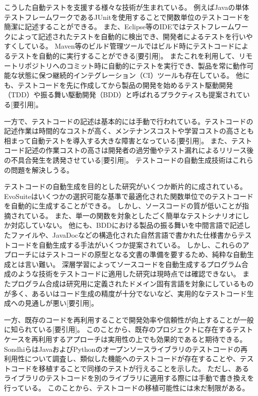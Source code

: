 \documentclass[conference]{IEEEtran}
\begin{document}
こうした自動テストを支援する様々な技術が生まれている。
例えばJavaの単体テストフレームワークであるJUnitを使用することで関数単位のテストコードを簡潔に記述することができる\cite{JUnit}。
また、Eclipse等のIDEではテストフレームワークによって記述されたテストを自動的に検出でき、開発者によるテストを行いやすくしている\cite{Eclipse}。
Maven等のビルド管理ツールではビルド時にテストコードによるテストを自動的に実行することができる[要引用]。
またこれを利用して、リモートリポジトリへのコミット時に自動的にテストを実行でき、製品を常に動作可能な状態に保つ継続的インテグレーション（CI）ツールも存在している\cite{TravisCI}。
他にも、テストコードを先に作成してから製品の開発を始めるテスト駆動開発（TDD）や振る舞い駆動開発（BDD）と呼ばれるプラクティスも提案されている[要引用]。

一方で、テストコードの記述は基本的には手動で行われている。テストコードの記述作業は時間的なコストが高く、メンテナンスコストや学習コストの高さとも相まって自動テストを導入する大きな障害となっている[要引用]。
また、テストコード記述の作業コストの高さは開発者の過労働やテスト漏れによるリリース後の不具合発生を誘発させている[要引用]。
テストコードの自動生成技術はこれらの問題を解決しうる。

テストコードの自動生成を目的とした研究がいくつか断片的に成されている。
EvoSuiteはいくつかの選択可能な基準で最適化された関数単位でのテストコードを自動的に生成することができる\cite{Fraser2013, Almasi2017}。
しかし、ソースコードの質が低いことが指摘されている\cite{Shamshiri2018}。
また、単一の関数を対象としたごく簡単なテストシナリオにしか対応していない。
他にも、BDDにおける製品の振る舞いを中間言語で記述したファイルや、JavaDocなどの構造化された自然言語で書かれた仕様書からテストコードを自動生成する手法がいくつか提案されている\cite{Motwani2019, JBehave}。
しかし、これらのアプローチにはテストコードの原型となる文書の準備を要するため、純粋な自動生成とは言い難い。
深層学習によってソースコードを自動生成するプログラム合成のような技術をテストコードに適用した研究は現時点では確認できない。
またプログラム合成は研究用に定義されたドメイン固有言語を対象にしているものが多く、あるいはコード生成の精度が十分でないなど、実用的なテストコード生成への見通しが悪い[要引用]。

一方、既存のコードを再利用することで開発効率や信頼性が向上することが一般に知られている[要引用]。
このことから、既存のプロジェクトに存在するテストケースを再利用するアプローチは実用性の上でも効果的であると期待できる。
SondhiらはJavaおよびPythonのオープンソースライブラリのテストコードの再利用性について調査し、類似した機能へのテストコードが存在することや、テストコードを移植することで同様のテストが行えることを示した\cite{Sondhi2019}。
ただし、あるライブラリのテストコードを別のライブラリに適用する際には手動で書き換えを行っている。
このことから、テストコードの移植可能性には未だ制限がある。
\end{document}
